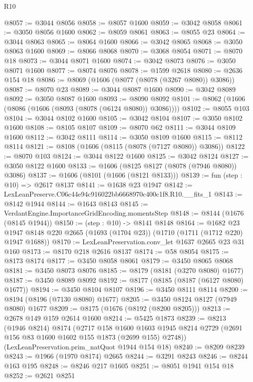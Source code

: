 \begin{lexlean}{R10}
\begin{coremodule}
@8057 := @3044 @8056
@8058 := @8057 @1600
@8059 := @3042 @8058
@8061 := @3050 @8056 @1600
@8062 := @8059 @8061
@8063 := @8055 @23
@8064 := @3044 @8063
@8065 := @8064 @1600
@8066 := @3042 @8065
@8068 := @3050 @8063 @1600
@8069 := @8066 @8068
@8070 := @3068 @8054
@8071 := @8070 @18
@8073 := @3044 @8071 @1600
@8074 := @3042 @8073
@8076 := @3050 @8071 @1600
@8077 := @8074 @8076
@8078 := @1599 @2618
@8080 := @2636 @154 @18
@8086 := @8069 (@1606 (@8077 (@8078 (@3267 @8080)) @3086))
@8087 := @8070 @23
@8089 := @3044 @8087 @1600
@8090 := @3042 @8089
@8092 := @3050 @8087 @1600
@8093 := @8090 @8092
@8101 := @8062 (@1606 (@8086 (@1606 (@8093 (@8078 (@6124 @8080)) @3086))))
@8102 := @8055 @103
@8104 := @3044 @8102 @1600
@8105 := @3042 @8104
@8107 := @3050 @8102 @1600
@8108 := @8105 @8107
@8109 := @8070 @62
@8111 := @3044 @8109 @1600
@8112 := @3042 @8111
@8114 := @3050 @8109 @1600
@8115 := @8112 @8114
@8121 := @8108 (@1606 (@8115 (@8078 (@7127 @8080)) @3086))
@8122 := @8070 @103
@8124 := @3044 @8122 @1600
@8125 := @3042 @8124
@8127 := @3050 @8122 @1600
@8133 := @1606 (@8125 @8127 (@8078 (@7946 @8080)) @3086)
@8137 := @1606 (@8101 (@1606 (@8121 @8133)))
@8139 := fun (step : @10) => @2617 @8137
@8141 := @1638 @23 @1947
@8142 := LexLeanPreserve.C06c44e94c916022bb6668970c400c1f8.R10.__fits_1
@8143 := @8142 @1944
@8144 := @1643 @8143
@8145 := VerdantEngine.ImportanceGridEncoding.momentsStep
@8148 := @8144 (@1676 (@8145 @1944))
@8150 := (step : @10) -> @8141 @8148
@8164 := @1682
    @23
    @1947
    @8148
    @220
    @2665
    (@1693 (@1704 @23))
    (@1710 (@1711 (@1712 @220) @1947 @1688))
@8170 := LexLeanPreservation.conv_let @1637 @2665 @23 @31 @160
@8173 := @8170 @218 @2616 @8137
@8174 := @58 @8054
@8175 := @8173 @8174
@8177 := @3450 @8058 @8061
@8179 := @3450 @8065 @8068
@8181 := @3450 @8073 @8076
@8185 := @8179 (@8181 (@3270 @8080) @1677)
@8187 := @3450 @8089 @8092
@8192 := @8177 (@8185 (@8187 (@6127 @8080) @1677))
@8194 := @3450 @8104 @8107
@8196 := @3450 @8111 @8114
@8200 := @8194 (@8196 (@7130 @8080) @1677)
@8205 := @3450 @8124 @8127 (@7949 @8080) @1677
@8209 := @8175 (@1676 (@8192 (@8200 @8205)))
@8213 := @2678 @149 @159 @2614 @1600
@8214 := @5425 @1873
@8239 := @8213
    (@1946 @8214)
    @8174
    (@2717
      @158
      @1600
      @1603
      @1945
      @8214
      @2729
      (@2691 @156 @83 @1600 @1602 @155 @1873 (@2699 @155) @2748))
    (LexLeanPreservation.prim_natQuot @1944 @154 @18)
@8240 := @8209 @8239
@8243 := @1966 (@1970 @8174) @2665
@8244 := @3291 @8243
@8246 := @8244 @163 @195
@8248 := @8246 @217 @1605
@8251 := @8051 @1941 @154 @18
@8252 := @2621 @8251

\end{coremodule}
\end{lexlean}
